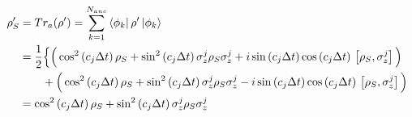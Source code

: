 \documentclass[a4paper,12pt]{article}
\begin{document}
	  \begin{align}
	  	\rho_S' & = Tr_a(\rho') = \sum_{k=1}^{N_{anc}}{\bra{\phi_k}\rho'\ket{\phi_k}} \notag \\
	  	&= \frac{1}{2} \Big\{ \Big( \cos^{2}{\left( c_j \Delta t \right)} \, \rho_S + \sin^{2}{\left( c_j \Delta t \right)} \, \sigma_{z}^{j}\rho_S\sigma_{z}^{j} 
	  	+i \sin{\left( c_j \Delta t \right)}\cos{\left( c_j \Delta t \right)} \, \left[ \rho_S, \sigma_{z}^{j} \right] \Big) \notag \\
	  	& \qquad  + \Big( \cos^{2}{\left( c_j \Delta t \right)} \, \rho_S + \sin^{2}{\left( c_j \Delta t \right)} \, \sigma_{z}^{j}\rho_S\sigma_{z}^{j} 
	  	-i \sin{\left( c_j \Delta t \right)}\cos{\left( c_j \Delta t \right)} \, \left[ \rho_S, \sigma_{z}^{j} \right] \Big) \notag \\
	  	& =	\cos^{2}{\left( c_j \Delta t \right)} \, \rho_S + \sin^{2}{\left( c_j \Delta t \right)} \, \sigma_{z}^{j}\rho_S\sigma_{z}^{j} 
	  \end{align}	
	  

	  
\end{document}
